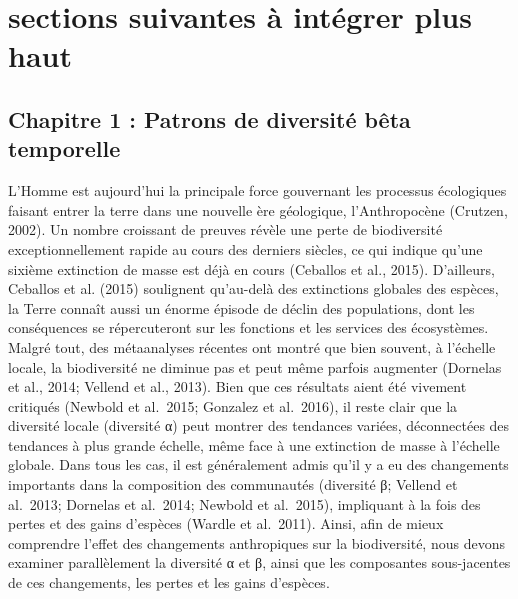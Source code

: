 \documentclass[
]{article}
\begin{document}
\hypertarget{sections-suivantes-uxe0-intuxe9grer-plus-haut}{%
\section{sections suivantes à intégrer plus
haut}\label{sections-suivantes-uxe0-intuxe9grer-plus-haut}}

\hypertarget{chapitre-1-patrons-de-diversituxe9-buxeata-temporelle}{%
\subsection{Chapitre 1 : Patrons de diversité bêta
temporelle}\label{chapitre-1-patrons-de-diversituxe9-buxeata-temporelle}}

L'Homme est aujourd'hui la principale force gouvernant les processus
écologiques faisant entrer la terre dans une nouvelle ère géologique,
l'Anthropocène (Crutzen, 2002). Un nombre croissant de preuves révèle
une perte de biodiversité exceptionnellement rapide au cours des
derniers siècles, ce qui indique qu'une sixième extinction de masse est
déjà en cours (Ceballos et al., 2015). D'ailleurs, Ceballos et al.
(2015) soulignent qu'au-delà des extinctions globales des espèces, la
Terre connaît aussi un énorme épisode de déclin des populations, dont
les conséquences se répercuteront sur les fonctions et les services des
écosystèmes. Malgré tout, des métaanalyses récentes ont montré que bien
souvent, à l'échelle locale, la biodiversité ne diminue pas et peut même
parfois augmenter (Dornelas et al., 2014; Vellend et al., 2013). Bien
que ces résultats aient été vivement critiqués (Newbold et al.~2015;
Gonzalez et al.~2016), il reste clair que la diversité locale (diversité
α) peut montrer des tendances variées, déconnectées des tendances à plus
grande échelle, même face à une extinction de masse à l'échelle globale.
Dans tous les cas, il est généralement admis qu'il y a eu des
changements importants dans la composition des communautés (diversité β;
Vellend et al.~2013; Dornelas et al.~2014; Newbold et al.~2015),
impliquant à la fois des pertes et des gains d'espèces (Wardle et
al.~2011). Ainsi, afin de mieux comprendre l'effet des changements
anthropiques sur la biodiversité, nous devons examiner parallèlement la
diversité α et β, ainsi que les composantes sous-jacentes de ces
changements, les pertes et les gains d'espèces.
\end{document}
